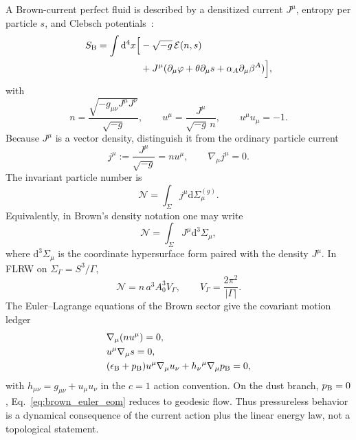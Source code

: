 \documentclass[
  aps,
  prd,
  reprint,
  superscriptaddress,
  floatfix,
  nofootinbib,
  longbibliography
]{revtex4-2}
\theoremstyle{plain}
\theoremstyle{definition}
\theoremstyle{remark}
\newcommand{\dd}{\mathrm d}
\newcommand{\Ecal}{\mathcal E}
\newcommand{\Ncal}{\mathcal N}
\begin{document}
A Brown-current perfect fluid is described by a densitized current $J^\mu$, entropy per particle $s$, and Clebsch potentials~\cite{Schutz1970,Brown1993}:
\begin{equation}
\begin{aligned}
S_{\rm B}=\int \dd^4x\Big[&-\sqrt{-g}\,\Ecal(n,s)\nonumber\\
&+J^\mu(\partial_\mu\varphi+\theta\partial_\mu s+
\alpha_A\partial_\mu\beta^A)\Big],
\end{aligned}
\label{eq:brown_action}
\end{equation}
with
\begin{equation}
n=\frac{\sqrt{-g_{\mu\nu}J^\mu J^\nu}}{\sqrt{-g}},
\qquad
u^\mu=\frac{J^\mu}{\sqrt{-g}\,n},
\qquad
u^\mu u_\mu=-1.
\end{equation}
Because $J^\mu$ is a vector density, distinguish it from the ordinary particle current
\begin{equation}
j^\mu:=\frac{J^\mu}{\sqrt{-g}}=n u^\mu,
\qquad
\nabla_\mu j^\mu=0 .
\label{eq:ordinary_current}
\end{equation}
The invariant particle number is
\begin{equation}
\boxed{
\Ncal=\int_\Sigma j^\mu\dd\Sigma^{(g)}_\mu.}
\label{eq:number_covariant}
\end{equation}
Equivalently, in Brown's density notation one may write
\begin{equation}
\Ncal=\int_\Sigma J^\mu\dd^3\Sigma_\mu,
\end{equation}
where $\dd^3\Sigma_\mu$ is the coordinate hypersurface form paired with the density $J^\mu$.  In FLRW on $\Sigma_\Gamma=S^3/\Gamma$,
\begin{equation}
\Ncal=n\,a^3 A_0^3 V_\Gamma,
\qquad
V_\Gamma=\frac{2\pi^2}{|\Gamma|}.
\end{equation}
The Euler--Lagrange equations of the Brown sector give the covariant motion ledger
\begin{align}
&\nabla_\mu(nu^\mu)=0,
\label{eq:brown_number_eom}\\
&u^\mu\nabla_\mu s=0,
\label{eq:brown_entropy_eom}\\
&(\epsilon_{\rm B}+p_{\rm B})u^\mu\nabla_\mu u_\nu
+h_\nu{}^\mu\nabla_\mu p_{\rm B}=0,
\label{eq:brown_euler_eom}
\end{align}
with $h_{\mu\nu}=g_{\mu\nu}+u_\mu u_\nu$ in the $c=1$ action convention.  On the dust branch, $p_{\rm B}=0$, Eq.~\eqref{eq:brown_euler_eom} reduces to geodesic flow.  Thus pressureless behavior is a dynamical consequence of the current action plus the linear energy law, not a topological statement.
\end{document}

